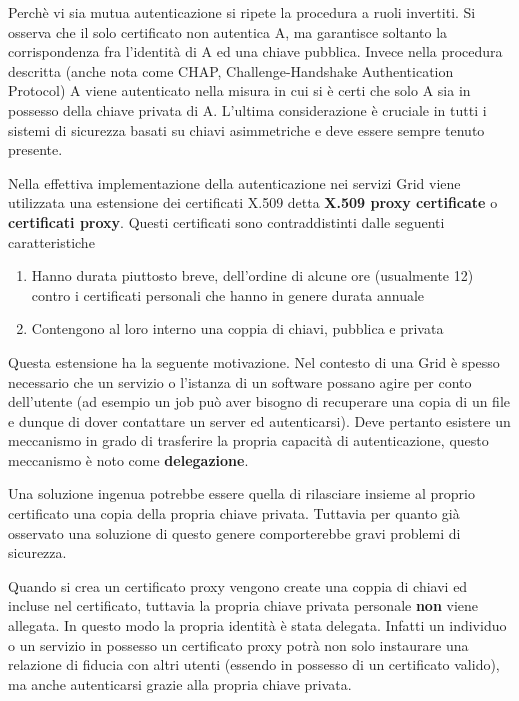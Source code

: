 \documentclass[italian,]{article}
\providecommand{\tightlist}{%
  \setlength{\itemsep}{0pt}\setlength{\parskip}{0pt}}
\begin{document}
Perchè vi sia mutua autenticazione si ripete la procedura a ruoli
invertiti. Si osserva che il solo certificato non autentica A, ma
garantisce soltanto la corrispondenza fra l'identità di A ed una chiave
pubblica. Invece nella procedura descritta (anche nota come CHAP,
Challenge-Handshake Authentication Protocol) A viene autenticato nella
misura in cui si è certi che solo A sia in possesso della chiave privata
di A. L'ultima considerazione è cruciale in tutti i sistemi di sicurezza
basati su chiavi asimmetriche e deve essere sempre tenuto presente.

Nella effettiva implementazione della autenticazione nei servizi Grid
viene utilizzata una estensione dei certificati X.509 detta
\textbf{X.509 proxy certificate} o \textbf{certificati proxy}. Questi
certificati sono contraddistinti dalle seguenti caratteristiche

\begin{enumerate}
\def\labelenumi{\arabic{enumi}.}
\tightlist
\item
  Hanno durata piuttosto breve, dell'ordine di alcune ore (usualmente
  12) contro i certificati personali che hanno in genere durata annuale
\item
  Contengono al loro interno una coppia di chiavi, pubblica e privata
\end{enumerate}

Questa estensione ha la seguente motivazione. Nel contesto di una Grid è
spesso necessario che un servizio o l'istanza di un software possano
agire per conto dell'utente (ad esempio un job può aver bisogno di
recuperare una copia di un file e dunque di dover contattare un server
ed autenticarsi). Deve pertanto esistere un meccanismo in grado di
trasferire la propria capacità di autenticazione, questo meccanismo è
noto come \textbf{delegazione}.

Una soluzione ingenua potrebbe essere quella di rilasciare insieme al
proprio certificato una copia della propria chiave privata. Tuttavia per
quanto già osservato una soluzione di questo genere comporterebbe gravi
problemi di sicurezza.

Quando si crea un certificato proxy vengono create una coppia di chiavi
ed incluse nel certificato, tuttavia la propria chiave privata personale
\textbf{non} viene allegata. In questo modo la propria identità è stata
delegata. Infatti un individuo o un servizio in possesso un certificato
proxy potrà non solo instaurare una relazione di fiducia con altri
utenti (essendo in possesso di un certificato valido), ma anche
autenticarsi grazie alla propria chiave privata.
\end{document}
